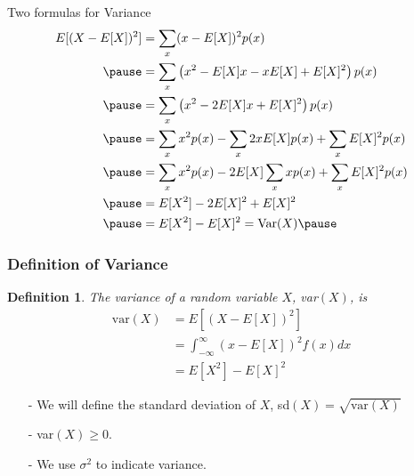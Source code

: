 \documentclass[aspectratio=169, handout]{beamer}
\newtheorem{defn}{Definition}
\numberwithin{equation}{section}
\begin{document}
\begin{frame}{Two formulas for Variance}
\begin{align*} 
E[(X - E[X])^2] &= \sum_{x} (x  - E[X])^2p(x) \\  \pause 
& =  \sum_{x} \left(x^2  -E[X] x -x E[X] + E[X]^2\right) p(x)   \\  \pause 
& =  \sum_{x} \left(x^2  -2E[X] x  + E[X]^2\right) p(x)  \\  \pause 
& =  \sum_{x} x^2 p(x)   - \sum_{x} 2x E[X]p(x) + \sum_{x} E[X]^2 p(x)   \\  \pause 
& =  \sum_{x} x^2 p(x)   - 2E[X] \sum_{x} x p(x) + \sum_{x} E[X]^2 p(x)   \\  \pause 
& =  E[X^2] - 2E[X]^2 + E[X]^2  \\ \pause 
& =  E[X^2] - E[X]^2 =  \text{Var}(X) \pause 
\end{align*}
\end{frame}


\begin{frame}
\frametitle{Definition of Variance}

\begin{defn}
The variance of a random variable $X$, var$(X)$, is 
\begin{align*}
 \text{var}(X) &= E[(X - E[X])^2]  \\
 &=  \int_{-\infty}^{\infty} (x - E[X])^2f(x) dx \\
 &=   E[X^2] - E[X]^2 \
\end{align*}
\end{defn}

\begin{itemize}
\item[-] We will define the standard deviation of $X$, sd$(X) = \sqrt{\text{var}(X)} $
\item[-] var$(X) \geq 0$.  
\item[-] We use $\sigma^2$ to indicate variance.
\end{itemize}


\end{frame}
\end{document}
